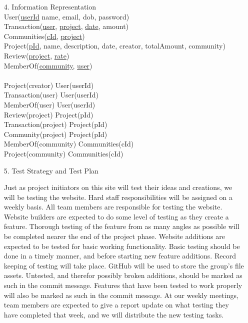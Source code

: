 \documentclass[12pt]{article}
\begin{document}
\begin{enumerate}
\item[4.] Information Representation\\
User(\underline{userId} name, email, dob, password)\\
Transaction(\underline{user}, \underline{project}, \underline{date}, amount)\\
Communities(\underline{cId}, \underline{project})\\
Project(\underline{pId}, name, description, date, creator, totalAmount, community)\\
Review(\underline{project}, \underline{rate})\\
MemberOf(\underline{community}, \underline{user})\\
\\
Project(creator) \subseteq User(userId)\\
Transaction(user) \subseteq User(userId)\\
MemberOf(user) \subseteq User(userId)\\
Review(project) \subseteq Project(pId)\\
Transaction(project) \subseteq Project(pId)\\
Community(project) \subseteq Project(pId)\\
MemberOf(community) \subseteq Communities(cId)\\
Project(community) \subseteq Communities(cId)\\

\item[5.] Test Strategy and Test Plan

Just as project initiators on this site will test their ideas and creations, we will be testing the website. Hard staff responsibilities will be assigned on a weekly basis. All team members are responsible for testing the website. Website builders are expected to do some level of testing as they create a feature. Thorough testing of the feature from as many angles as possible will be completed nearer the end of the project phase. Website additions are expected to be tested for basic working functionality. Basic testing should be done in a timely manner, and before starting new feature additions. Record keeping of testing will take place. GitHub will be used to store the group’s file assets. Untested, and therefor possibly broken additions, should be marked as such in the commit message. Features that have been tested to work properly will also be marked as such in the commit message. At our weekly meetings, team members are expected to give a report update on what testing they have completed that week, and we will distribute the new testing tasks.


\end{enumerate}
\end{document}
